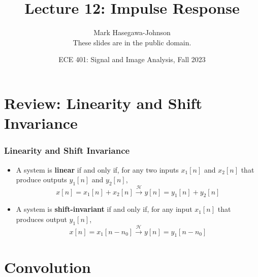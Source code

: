 \documentclass{beamer}
\title{Lecture 12: Impulse Response}
\author{Mark Hasegawa-Johnson\\These slides are in the public domain.}
\date{ECE 401: Signal and Image Analysis, Fall 2023}
\begin{document}
\begin{frame}
  \maketitle
\end{frame}

\begin{frame}
  \tableofcontents
\end{frame}

\section[Review]{Review: Linearity and Shift Invariance}
\setcounter{subsection}{1}


\begin{frame}
  \frametitle{Linearity and Shift Invariance}
  \begin{itemize}
  \item A system is {\bf linear} if and only if, for any two inputs
    $x_1[n]$ and $x_2[n]$ that produce outputs $y_1[n]$ and $y_2[n]$,
    \[
    x[n]=x_1[n]+x_2[n] \stackrel{\mathcal H}{\longrightarrow}  y[n]=y_1[n]+y_2[n]
    \]
  \item A system is {\bf shift-invariant} if and only if, for any input
    $x_1[n]$ that produces output $y_1[n]$,
    \[
    x[n]=x_1[n-n_0] \stackrel{\mathcal H}{\longrightarrow}  y[n]=y_1[n-n_0]
    \]
  \end{itemize}
\end{frame}


\section[Convolution]{Convolution}
\setcounter{subsection}{1}
\end{document}
